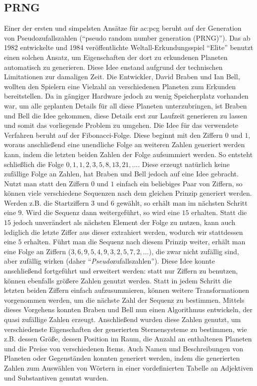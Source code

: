 \subsection{PRNG}
Einer der ersten und simpelsten Ansätze für \gls{ac:pcg} beruht auf der Generation von Pseudozufallszahlen (``pseudo random number
generation (PRNG)''). \cite{25_hendrikx_et_al} Das ab 1982 entwickelte und 1984 veröffentlichte Weltall-Erkundungsspiel ``Elite''
benutzt einen solchen Ansatz, um Eigenschaften der dort zu erkundenen Planeten automatisch zu generieren. \cite{36_spufford}
Diese Idee enstand aufgrund der technischen Limitationen zur damaligen Zeit. Die Entwickler, David Braben und Ian Bell, wollten den Spielern
eine Vielzahl an verschiedenen Planeten zum Erkunden bereitstellen. Da in gängiger Hardware jedoch zu wenig Speicherplatz vorhanden war,
um alle geplanten Details für all diese Planeten unterzubringen, ist Braben und Bell die Idee gekommen, diese Details erst zur Laufzeit
generieren zu lassen und somit das vorliegende Problem zu umgehen. Die Idee für das verwendete Verfahren beruht auf der Fibonacci-Folge.
Diese beginnt mit den Ziffern \(0\)
und \(1\), woraus anschließend eine unendliche Folge an weiteren Zahlen generiert werden kann, indem die letzten beiden Zahlen der Folge
aufsummiert werden. So entsteht schließlich die Folge \(0, 1, 1, 2, 3, 5, 8, 13, 21, \dots\). Diese erzeugt natürlich keine zufällige Folge
an Zahlen, hat Braben und Bell jedoch auf eine Idee gebracht. Nutzt man statt den Ziffern \(0\) und \(1\) einfach ein beliebiges
Paar von Ziffern, so können viele verschiedene Sequenzen nach dem gleichen Prinzip generiert werden. Werden z.B. die Startziffern \(3\)
und \(6\) gewählt, so erhält man im nächsten Schritt eine \(9\). Wird die Sequenz dann weitergeführt, so wird eine \(15\) erhalten. Statt
die \(15\) jedoch unverändert als nächsten Element der Folge zu nutzen, kann auch lediglich die letzte Ziffer aus dieser extrahiert werden,
wodurch wir stattdessen eine \(5\) erhalten. Führt man die Sequenz nach diesem Prinzip weiter, erhält man eine Folge an Ziffern
(\(3, 6, 9, 5, 4, 9, 3, 2, 5, 7, 2, \dots\)), die zwar nicht zufällig sind, aber zufällig wirken (daher ``\textit{Pseudo}zufallszahlen'').
Diese Idee konnte anschließend fortgeführt und erweitert werden: statt nur Ziffern zu benutzen, können ebenfalls größere Zahlen genutzt werden.
Statt in jedem Schritt die letzten beiden Ziffern einfach aufzusummieren, können weitere Transformationen vorgenommen werden, um die nächste
Zahl der Sequenz zu bestimmen. Mittels dieses Vorgehens konnten Braben und Bell nun einen Algorithmus entwickeln, der quasi zufällige Zahlen
erzeugt. Anschließend wurden diese Zahlen genutzt, um verschiedenste Eigenschaften der generierten Sternensysteme zu bestimmen, wie z.B. dessen Größe,
dessen Position im Raum, die Anzahl an enthaltenen Planeten und die Preise von verschiedenen Items. Auch Namen und Beschreibungen von Planeten
oder Gegenständen konnten generiert werden, indem die generierten Zahlen zum Auswählen von Wörtern in einer vordefinierten Tabelle an Adjektiven
und Substantiven genutzt wurden. \cite{36_spufford}

